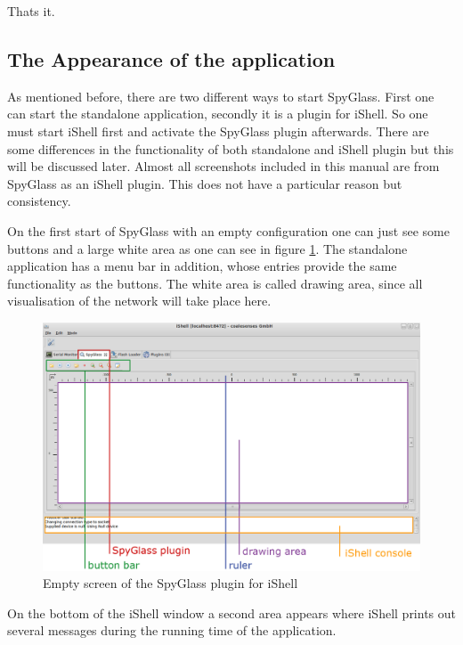 Thats it.

\subsection{The Appearance of the application}

As mentioned before, there are two different ways to start SpyGlass. First one can start the standalone application,
secondly it is a plugin for
iShell. So one must start iShell first and activate the SpyGlass plugin afterwards.
There are some differences in the functionality of both standalone and iShell plugin but this will be discussed later.
Almost all screenshots included in this manual are from SpyGlass as an iShell plugin. This does not have a particular reason
but consistency.

On the first start of SpyGlass with an empty configuration one can just see some buttons and a large white area as one
can see in figure \ref{pic:spyglass_first_appearance}.
The standalone application has a menu bar in addition, whose entries provide the same functionality as the buttons. The white
area is called drawing area, since all visualisation of the network will take place here.

\begin{figure}[htb]
  \begin{center}
    \includegraphics[width=13.2cm]{./pics/spyglass_first_appearance}
    \caption{Empty screen of the SpyGlass plugin for iShell}
    \label{pic:spyglass_first_appearance}
  \end{center}
\end{figure}

On the bottom of the iShell window a second area appears where iShell prints out several messages during the
running time of the application.

